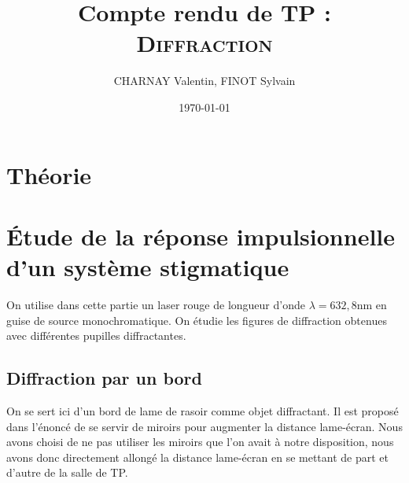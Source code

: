 \documentclass[12pt,a4paper]{article}
\author{CHARNAY Valentin, FINOT Sylvain}
\title{Compte rendu de TP :\\[4pt] \scshape Diffraction}
\date{\today}
\begin{document}
	\maketitle
	\section{Théorie}
	\section{Étude de la réponse impulsionnelle d'un système stigmatique}
	On utilise dans cette partie un laser rouge de longueur d'onde $\lambda=632,8$nm en guise de source monochromatique. On étudie les figures de diffraction obtenues avec différentes pupilles diffractantes.
	\subsection{Diffraction par un bord}
	On se sert ici d'un bord de lame de rasoir comme objet diffractant. Il est proposé dans l'énoncé de se servir de miroirs pour augmenter la distance lame-écran. Nous avons choisi de ne pas utiliser les miroirs que l'on avait à notre disposition, nous avons donc directement allongé la distance lame-écran en se mettant de part et d'autre de la salle de TP.
	
\end{document}
